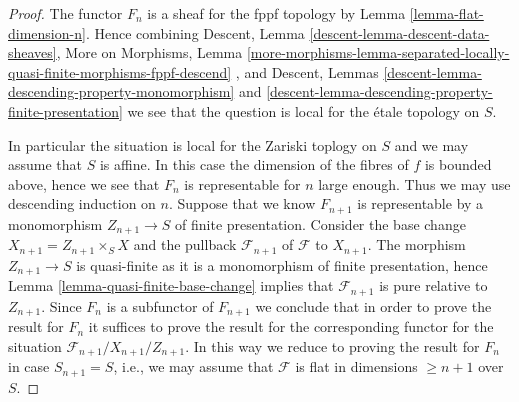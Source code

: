 \begin{proof}
The functor $F_n$ is a sheaf for the fppf topology by
Lemma \ref{lemma-flat-dimension-n}.
Hence combining
Descent, Lemma \ref{descent-lemma-descent-data-sheaves},
More on Morphisms, Lemma
\ref{more-morphisms-lemma-separated-locally-quasi-finite-morphisms-fppf-descend}
, and
Descent, Lemmas \ref{descent-lemma-descending-property-monomorphism} and
\ref{descent-lemma-descending-property-finite-presentation}
we see that the question is local for the \'etale topology on $S$.

\medskip\noindent
In particular the situation is local for the Zariski toplogy on $S$
and we may assume that $S$ is affine. In this case the dimension of the
fibres of $f$ is bounded above, hence we see that $F_n$ is representable
for $n$ large enough. Thus we may use descending induction on $n$.
Suppose that we know $F_{n + 1}$ is representable by a monomorphism
$Z_{n + 1} \to S$ of finite presentation. Consider the base change
$X_{n + 1} = Z_{n + 1} \times_S X$ and the pullback $\mathcal{F}_{n + 1}$
of $\mathcal{F}$ to $X_{n + 1}$. The morphism $Z_{n + 1} \to S$ is
quasi-finite as it is a monomorphism of finite presentation, hence
Lemma \ref{lemma-quasi-finite-base-change}
implies that $\mathcal{F}_{n + 1}$ is pure relative to $Z_{n + 1}$.
Since $F_n$ is a subfunctor of $F_{n + 1}$ we conclude that in order
to prove the result for $F_n$ it suffices to prove the result for the
corresponding functor for the situation
$\mathcal{F}_{n + 1}/X_{n + 1}/Z_{n + 1}$.
In this way we reduce to proving the result for $F_n$ in case
$S_{n + 1} = S$, i.e., we may assume that $\mathcal{F}$ is flat
in dimensions $\geq n + 1$ over $S$.


\end{proof}
